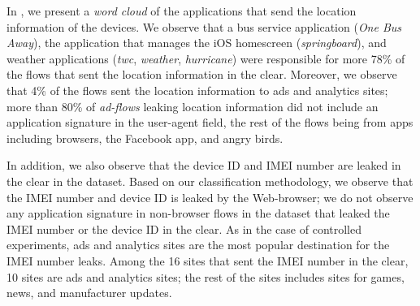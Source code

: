 In , we present a \emph{word cloud} of
the applications that send the location information of the devices.
We observe that a bus service application (\emph{One Bus Away}), the
application that manages the iOS homescreen (\emph{springboard}), and
weather applications (\emph{twc}, \emph{weather}, \emph{hurricane})
were responsible for more 78\% of the flows that sent the location
information in the clear.  Moreover, we observe that 4\% of the flows
sent the location information to ads and analytics sites; more than
80\% of \emph{ad-flows} leaking location information did not include
an application signature in the user-agent field, the rest of the
flows being from apps including browsers, the Facebook app, and angry birds.

In addition, we also observe that the device ID and IMEI
number are leaked in the clear in the \mobWild dataset.  Based on our
classification methodology, we observe that the IMEI number and device
ID is leaked by the Web-browser; we do not observe
any application signature in non-browser flows in the \mobWild dataset
that leaked the IMEI number or the device ID in the clear.  As in the
case of controlled experiments, ads and analytics sites are the most
popular destination for the IMEI number leaks.  Among the 16 sites
that sent the IMEI number in the clear, 10 sites are ads and
analytics sites; the rest of the sites includes sites for games, news,
and manufacturer updates.








